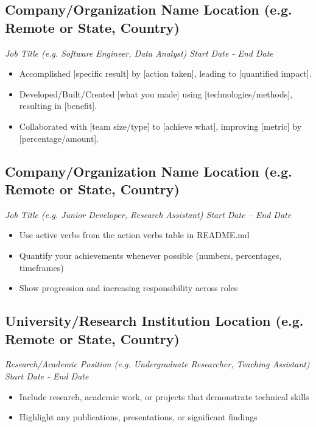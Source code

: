 \documentclass[a4paper,10pt]{article}
\begin{document}
    \subsection*{\texorpdfstring{
            \textbf{Company/Organization Name} \hfill Location (e.g. Remote or State, Country)
        }{
            Company Name -- Location
        }}
    \textit{Job Title (e.g. Software Engineer, Data Analyst) \hfill Start Date - End Date}
        \begin{itemize} 
            \item Accomplished [specific result] by [action taken], leading to [quantified impact].
            \item Developed/Built/Created [what you made] using [technologies/methods], resulting in [benefit].
            \item Collaborated with [team size/type] to [achieve what], improving [metric] by [percentage/amount].
        \end{itemize}

    \subsection*{\texorpdfstring{
        	\textbf{Company/Organization Name} \hfill Location (e.g. Remote or State, Country)
        }{
            Another Company/Organization -- Location
        }}
    \textit{Job Title (e.g. Junior Developer, Research Assistant) \hfill Start Date -- End Date}
        \begin{itemize}
            \item Use active verbs from the action verbs table in README.md
            \item Quantify your achievements whenever possible (numbers, percentages, timeframes)
            \item Show progression and increasing responsibility across roles
        \end{itemize}
        
    \subsection*{\texorpdfstring{
        	\textbf{University/Research Institution} \hfill Location (e.g. Remote or State, Country)
        }{
            University/Research Institution -- Location
        }}
    \textit{Research/Academic Position (e.g. Undergraduate Researcher, Teaching Assistant) \hfill Start Date - End Date}
        \begin{itemize}
            \item Include research, academic work, or projects that demonstrate technical skills
            \item Highlight any publications, presentations, or significant findings
        \end{itemize}
\end{document}
